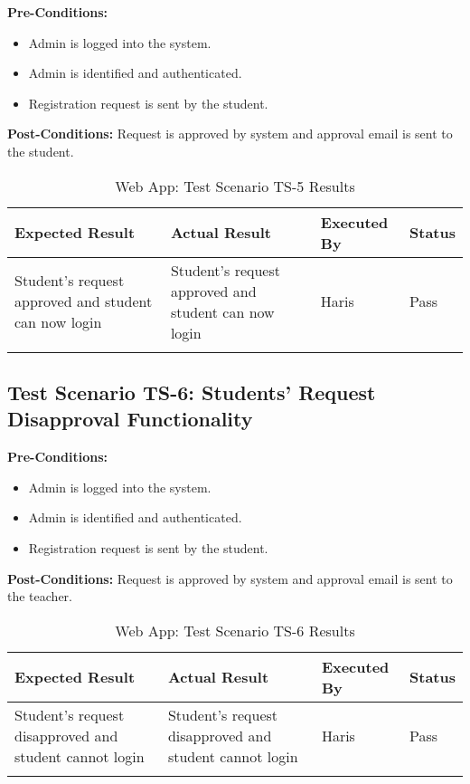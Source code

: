 \textbf{Pre-Conditions: }
\begin{itemize}

\item Admin is logged into the system.
\item Admin is identified and authenticated.
\item Registration request is sent by the student.

\end{itemize}
\textbf{Post-Conditions: } Request is approved by system and approval email is sent to the student. 

\bigskip

\begin{longtable}{|p{4cm}|p{4cm}|p{2cm}|p{2cm}|}
\hline
\textbf{Expected Result} & \textbf{Actual Result} & \textbf{Executed By} & \textbf{Status}\\
\hline
Student's request approved and student can now login &
Student's request approved and student can now login &
Haris &
Pass \\
\hline

\caption{Web App: Test Scenario TS-5 Results}
\end{longtable}





\subsection{Test Scenario TS-6: Students' Request Disapproval Functionality}

\textbf{Pre-Conditions: }
\begin{itemize}

\item Admin is logged into the system.
\item Admin is identified and authenticated.
\item Registration request is sent by the student.

\end{itemize}
\textbf{Post-Conditions: } Request is approved by system and approval email is sent to the teacher. 

\bigskip

\begin{longtable}{|p{4cm}|p{4cm}|p{2cm}|p{2cm}|}
\hline
\textbf{Expected Result} & \textbf{Actual Result} & \textbf{Executed By} & \textbf{Status}\\
\hline
Student's request disapproved and student cannot login &
Student's request disapproved and student cannot login &
Haris &
Pass \\
\hline

\caption{Web App: Test Scenario TS-6 Results}
\end{longtable}



